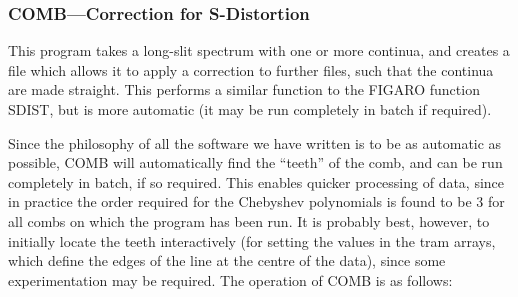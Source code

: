 \documentclass[11pt,twoside]{article}
\newcommand{\xref}[3]{#1}
\newcommand{\xlabel}[1]{}
\begin{document}
\subsubsection{\xlabel{combcorrection_for_sdistortion}%
COMB---Correction for S-Distortion}

This program takes a long-slit spectrum with one or more continua, and
creates a file which allows it to apply a correction to further files,
such that the continua are made straight.  This performs a similar
function to the \xref{FIGARO}{sun86}{} function SDIST, but is more
automatic (it may be run completely in batch if required).

Since the philosophy of all the software we have written is to be as
automatic as possible, COMB will automatically find the ``teeth'' of
the comb, and can be run completely in batch, if so required. This
enables quicker processing of data, since in practice the order
required for the Chebyshev polynomials is
found to be 3 for all combs on which the program has been run. It is
probably best, however, to initially locate the teeth interactively
(for setting the values in the tram arrays, which define the edges of
the line at the centre of the data), since some experimentation may be
required. The operation of COMB is as follows:
\end{document}
